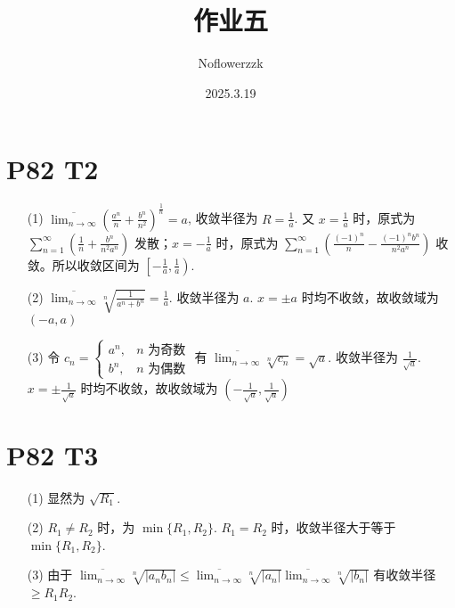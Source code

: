 \documentclass{article}
\title{作业五}
\author{Noflowerzzk}
\date{2025.3.19}
\begin{document}
\maketitle

\section*{P82 T2}

\begin{itemize}
    \item [(1)] $\overline{\lim_{n \to \infty}}\left(\frac{a^n}{n} + \frac{b^n}{n^2}\right)^{\frac{1}{n}} = a$, 收敛半径为 $R = \frac{1}{a}$. 又 $x = \frac{1}{a}$ 时，原式为 $\sum_{n = 1}^{\infty}\left(\frac{1}{n} + \frac{b^n}{n^2a^n}\right)$ 发散；$x = -\frac{1}{a}$ 时，原式为 $\sum_{n = 1}^{\infty}\left(\frac{(-1)^n}{n} - \frac{(-1)^nb^n}{n^2a^n}\right)$ 收敛。所以收敛区间为 $\left[-\frac{1}{a}, \frac{1}{a}\right)$.
    \item [(2)] $\overline{\lim_{n \to \infty}}\sqrt[n]{\frac{1}{a^n + b^n}} = \frac{1}{a}$. 收敛半径为 $a$. $x = \pm a$ 时均不收敛，故收敛域为 $(-a, a)$
    \item [(3)] 令 $c_n = \begin{cases}
        a^n, & n \text{ 为奇数} \\
        b^n, & n \text{ 为偶数}
    \end{cases}$
    有 $\overline{\lim_{n \to \infty}}\sqrt[n]{c_n} = \sqrt{a}$. 收敛半径为 $\frac{1}{\sqrt{a}}$. $x = \pm \frac{1}{\sqrt{a}}$ 时均不收敛，故收敛域为 $\left(-\frac{1}{\sqrt{a}}, \frac{1}{\sqrt{a}}\right)$
\end{itemize}

\section*{P82 T3}

\begin{itemize}
    \item [(1)] 显然为 $\sqrt{R_1}$.
    \item [(2)] $R_1 \neq R_2$ 时，为 $\min \{R_1, R_2\}$. $R_1 = R_2$ 时，收敛半径大于等于 $\min \{R_1, R_2\}$.
    \item [(3)] 由于 $\overline{\lim_{n \to \infty}}\sqrt[n]{\left\lvert a_nb_n\right\rvert} \leq \overline{\lim_{n \to \infty}}\sqrt[n]{\left\lvert a_n\right\rvert}\overline{\lim_{n \to \infty}}\sqrt[n]{\left\lvert b_n\right\rvert}$ 有收敛半径 $\geq R_1R_2$.
\end{itemize}
\end{document}
